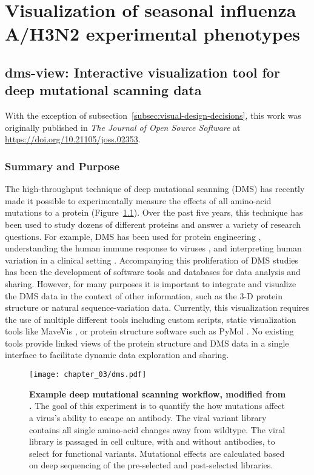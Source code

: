 \chapter{Visualization of seasonal influenza A/H3N2 experimental phenotypes}

\section{dms-view: Interactive visualization tool for deep mutational scanning data}

With the exception of subsection~\ref{subsec:visual-design-decisions}, this work was originally published in \emph{The Journal of Open Source Software} at \url{https://doi.org/10.21105/joss.02353}.

\subsection{Summary and Purpose}

The high-throughput technique of deep mutational scanning (DMS) \citep{fowler2014deep} has recently made it possible to experimentally measure the effects of all amino-acid mutations to a protein (Figure~\ref{fig:dms}).
Over the past five years, this technique has been used to study dozens of different proteins \citep{esposito2019mavedb} and answer a variety of research questions.
For example, DMS has been used for protein engineering \citep{wrenbeck2017deep}, understanding the human immune response to viruses \citep{Lee2019}, and interpreting human variation in a clinical setting \citep{starita2017variant,gelman2019recommendations}.
Accompanying this proliferation of DMS studies has been the development of software tools \citep{bloom2015software,rubin2017statistical} and databases \citep{esposito2019mavedb} for data analysis and sharing.
However, for many purposes it is important to integrate and visualize the DMS data in the context of other information, such as the 3-D protein structure or natural sequence-variation data.
Currently, this visualization requires the use of multiple different tools including custom scripts, static visualization tools like MaveVis \citep{esposito2019mavedb}, or protein structure software such as PyMol \citep{PyMOL}.
No existing tools provide linked views of the protein structure and DMS data in a single interface to facilitate dynamic data exploration and sharing.

\begin{figure}
  \centering
  \texttt{[image: chapter\_03/dms.pdf]}
  \caption[{Example deep mutational scanning workflow, modified from \citet{Lee2019}.}]{{\bf Example deep mutational scanning workflow, modified from \citet{Lee2019}.}
    The goal of this experiment is to quantify the how mutations affect a virus's ability to escape an antibody.
    The viral variant library contains all single amino-acid changes away from wildtype.
    The viral library is passaged in cell culture, with and without antibodies, to select for functional variants.
    Mutational effects are calculated based on deep sequencing of the pre-selected and post-selected libraries.\label{fig:dms}}
\end{figure}

